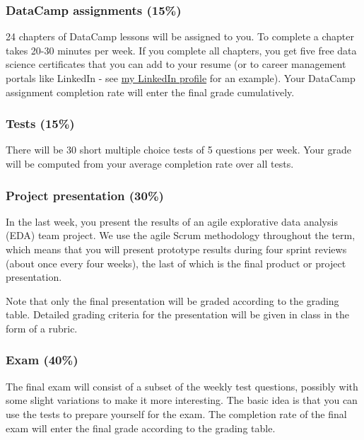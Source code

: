 \documentclass[11pt]{article}
\begin{document}
\subsubsection{DataCamp assignments (15\%)}
\label{sec:orga031af6}

24 chapters of DataCamp lessons will be assigned to you. To
complete a chapter takes 20-30 minutes per week. If you complete
all chapters, you get five free data science certificates that you
can add to your resume (or to career management portals like
LinkedIn - see \href{https://www.linkedin.com/in/birkenkrahe}{my LinkedIn profile} for an example). Your DataCamp
assignment completion rate will enter the final grade cumulatively.

\subsubsection{Tests (15\%)}
\label{sec:org41fe1ec}

There will be 30 short multiple choice tests of 5 questions per
week. Your grade will be computed from your average completion rate
over all tests.

\subsubsection{Project presentation (30\%)}
\label{sec:org7bf628c}

In the last week, you present the results of an agile explorative
data analysis (EDA) team project. We use the agile Scrum
methodology throughout the term, which means that you will present
prototype results during four sprint reviews (about once every four
weeks), the last of which is the final product or project
presentation.

Note that only the final presentation will be graded according to
the grading table. Detailed grading criteria for the presentation
will be given in class in the form of a rubric.

\subsubsection{Exam (40\%)}
\label{sec:org55a3467}

The final exam will consist of a subset of the weekly test
questions, possibly with some slight variations to make it more
interesting. The basic idea is that you can use the tests to
prepare yourself for the exam. The completion rate of the final
exam will enter the final grade according to the grading table.
\end{document}
